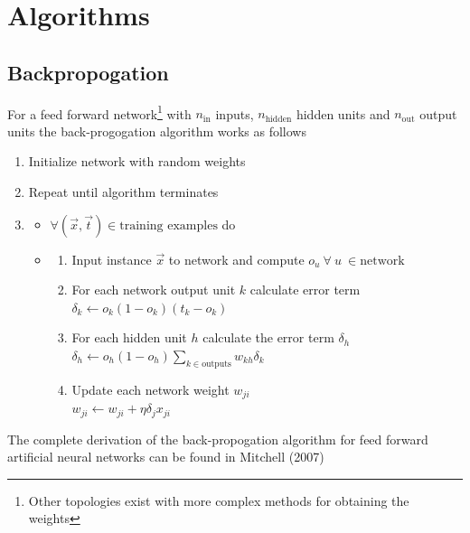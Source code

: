 
\chapter{Algorithms} \label{chap:app_algo}
\section{Backpropogation}
For a feed forward network\footnote{Other topologies exist with more complex methods for obtaining the weights} with $n_\text{in}$ inputs, $n_\text{hidden}$ hidden units and $n_\text{out}$ output units the back-progogation algorithm works as follows
\begin{enumerate}
\item Initialize network with random weights
\item Repeat until algorithm terminates
\item 
\begin{itemize}
\item $\forall (\vec{x},\vec{t}) \in \text{training examples}$ do
\item 
\begin{enumerate}
\item Input instance $\vec{x}$ to network and compute $o_u\ \forall\ u\ \in \text{network}$
\item For each network output unit $k$ calculate error term\\
$\delta_k \leftarrow o_k (1-o_k)(t_k - o_k)$
\item For each hidden unit $h$ calculate the error term $\delta_h$\\
$\delta_h \leftarrow o_h (1- o_h) \sum_{k \in \text{outputs}} w_{kh}\delta_k$
\item Update each network weight $w_{ji}$\\
$w_{ji} \leftarrow w_{ji} + \eta \delta_j x_{ji}$
\end{enumerate}
\end{itemize}
\end{enumerate}
The complete derivation of the back-propogation algorithm for feed forward artificial neural networks can be found in Mitchell (2007) \cite{Mitchell1997}


